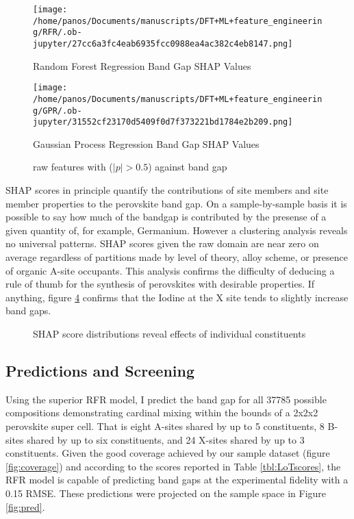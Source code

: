 \begin{figure}[htbp]
\centering
\texttt{[image: /home/panos/Documents/manuscripts/DFT+ML+feature\_engineering/RFR/.ob-jupyter/27cc6a3fc4eab6935fcc0988ea4ac382c4eb8147.png]}
\caption{\label{fig:rfrSHAP} Random Forest Regression Band Gap SHAP Values}
\end{figure}

\begin{figure}[htbp]
\centering
\texttt{[image: /home/panos/Documents/manuscripts/DFT+ML+feature\_engineering/GPR/.ob-jupyter/31552cf23170d5409f0d7f373221bd1784e2b209.png]}
\caption{\label{fig:gprSHAP} Gaussian Process Regression Band Gap SHAP Values}
\end{figure}

 
\begin{figure}[htbp]
\centering

\caption{\label{fig:rpear} raw features with (\(|p| > 0.5\)) against band gap}
\end{figure}

SHAP scores in principle quantify the contributions of site members and site member properties to the perovskite band gap.
On a sample-by-sample basis it is possible to say how much of the bandgap is contributed by the presense of a given quantity of, for example, Germanium.
However a clustering analysis reveals no universal patterns.
SHAP scores given the raw domain are near zero on average regardless of partitions made by level of theory, alloy scheme, or presence of organic A-site occupants.
This analysis confirms the difficulty of deducing a rule of thumb for the synthesis of perovskites with desirable properties.
If anything, figure \ref{fig:clusters} confirms that the Iodine at the X site tends to slightly increase band gaps.

 
\begin{figure}[htbp]
\centering

\caption{\label{fig:clusters} SHAP score distributions reveal effects of individual constituents}
\end{figure}

\subsection{Predictions and Screening}
\label{sec:orgee265d6}
Using the superior RFR model, I predict the band gap for all 37785 possible compositions demonstrating cardinal mixing within the bounds of a 2x2x2 perovskite super cell.
That is eight A-sites shared by up to 5 constituents, 8 B-sites shared by up to six constituents, and 24 X-sites shared by up to 3 constituents.
Given the good coverage achieved by our sample dataset (figure \ref{fig:coverage}) and according to the scores reported in Table \ref{tbl:LoTscores}, the RFR model is capable of predicting band gaps at the experimental fidelity with a 0.15 RMSE.
These predictions were projected on the sample space in Figure \ref{fig:pred}.

